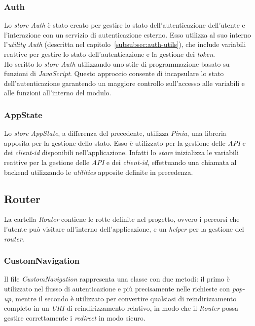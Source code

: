 \subsubsection{Auth}\label{subsubsec:auth-store}
Lo \textit{store Auth} è stato creato per gestire lo stato dell'autenticazione dell'utente e l'interazione con un servizio di autenticazione esterno.
Esso utilizza al suo interno l'\textit{utility Auth} (descritta nel capitolo~\ref{subsubsec:auth-utils}), che include variabili reattive per gestire lo stato dell'autenticazione e la gestione dei \textit{token}.\\
Ho scritto lo \textit{store Auth} utilizzando uno stile di programmazione basato su funzioni  di \textit{JavaScript}. Questo approccio consente di incapsulare
lo stato dell'autenticazione garantendo un maggiore controllo sull'accesso alle variabili e alle funzioni all'interno del modulo.

\subsubsection{AppState}\label{subsubsec:app-state}
Lo \textit{store AppState}, a differenza del precedente, utilizza \textit{Pinia}, una libreria apposita per la gestione dello stato.
Esso è utilizzato per la gestione delle \textit{API} e dei \textit{client-id} disponibili nell'applicazione. Infatti lo \textit{store} inizializza le variabili reattive per la gestione
delle \textit{API} e dei \textit{client-id}, effettuando una chiamata al backend utilizzando le \textit{utilities} apposite definite in precedenza.

\subsection{Router}\label{subsec:router}
La cartella \textit{Router} contiene le rotte definite nel progetto, ovvero i percorsi che l'utente può visitare all'interno dell'applicazione, e un \textit{helper} per la gestione del \textit{router}.
\subsubsection{CustomNavigation}\label{subsubsec:custom-navigation}
Il file \textit{CustomNavigation} rappresenta una classe con due metodi: il primo è utilizzato nel flusso di autenticazione e più precisamente nelle richieste con \textit{pop-up},
mentre il secondo è utilizzato per convertire qualsiasi  di reindirizzamento completo in un \textit{URI} di reindirizzamento relativo, in modo che il \textit{Router}
possa gestire correttamente i \textit{redirect} in modo sicuro.

